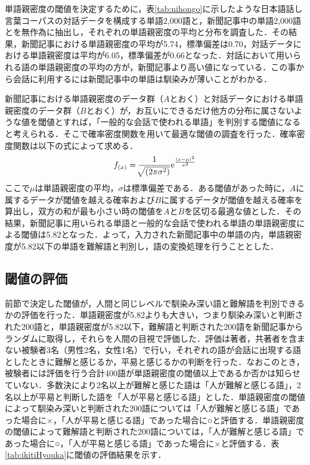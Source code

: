 \documentclass[japanese]{jnlp_1.4}
\begin{document}
単語親密度の閾値を決定するために，表\ref{tab:nihongo}に示したような日本語話し言葉コーパスの対話データを構成する単語2,000語と，新聞記事中の単語2,000語とを無作為に抽出し，それぞれの単語親密度の平均と分布を調査した．その結果，新聞記事における単語親密度の平均が5.74，標準偏差は0.70，対話データにおける単語親密度は平均が6.05，標準偏差が0.66となった．対話において用いられる語の単語親密度の平均の方が，新聞記事より高い値になっている．この事から会話に利用するには新聞記事中の単語は馴染みが薄いことがわかる．

新聞記事における単語親密度のデータ群（$A$とおく）と対話データにおける単語親密度のデータ群（$B$とおく）が，お互いにできるだけ他方の分布に属さないような値を閾値とすれば，「一般的な会話で使われる単語」を判別する閾値になると考えられる．そこで確率密度関数を用いて最適な閾値の調査を行った．確率密度関数は以下の式によって求める．
\begin{equation}
f_{(x)}=\frac{1}{\sqrt[ ]{\mathstrut (2\pi\sigma^{2})}}\mathrm{e}^{\frac{(x-\mu)^{2}}{\sigma^{2}}}
\end{equation}
ここで$\mu$は単語親密度の平均，$\sigma$は標準偏差である．ある閾値があった時に，$A$に属するデータが閾値を越える確率および$B$に属するデータが閾値を越える確率を算出し，双方の和が最も小さい時の閾値を$A$と$B$を区切る最適な値とした．その結果，新聞記事に用いられる単語と一般的な会話で使われる単語の単語親密度による閾値は5.82となった．よって，入力された新聞記事中の単語の内，単語親密度が5.82以下の単語を難解語と判別し，語の変換処理を行うこととした．


\subsection{閾値の評価}

前節で決定した閾値が，人間と同じレベルで馴染み深い語と難解語を判別できるかの評価を行った．単語親密度が5.82よりも大きい，つまり馴染み深いと判断された200語と，単語親密度が5.82以下，難解語と判断された200語を新聞記事からランダムに取得し，それらを人間の目視で評価した．評価は著者，共著者を含まない被験者3名（男性2名，女性1名）で行い，それぞれの語が会話に出現する語としたときに難解と感じるか，平易と感じるかの判断を行った．なおこのとき，被験者には評価を行う合計400語が単語親密度の閾値以上であるか否かは知らせていない．多数決により2名以上が難解と感じた語は「人が難解と感じる語」，2名以上が平易と判断した語を「人が平易と感じる語」とした．単語親密度の閾値によって馴染み深いと判断された200語については「人が難解と感じる語」であった場合に×，「人が平易と感じる語」であった場合に○と評価する．単語親密度の閾値によって難解語と判断された200語については，「人が難解と感じる語」であった場合に○，「人が平易と感じる語」であった場合に×と評価する．表\ref{tab:ikitiHyouka}に閾値の評価結果を示す．
\end{document}
